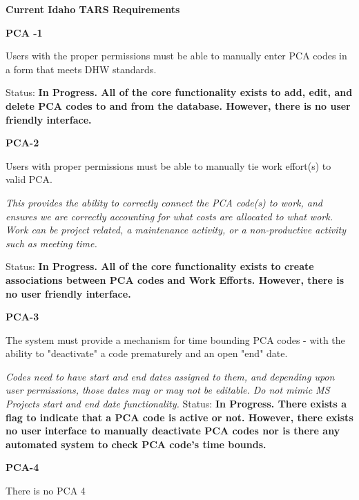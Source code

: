 \documentclass{article}
\begin{document}

\noindent \textbf{Current Idaho TARS Requirements}

\noindent \textit{}

\noindent \textbf{PCA -1}

\noindent Users with the proper permissions must be able to manually enter PCA codes in a form that meets DHW standards.

\noindent Status: \textbf{In Progress.  All of the core functionality exists to add, edit, and delete PCA codes to and from the database.  However, there is no user friendly interface.}

\noindent \textit{}


\noindent \textbf{PCA-2}

\noindent Users with proper permissions must be able to manually tie work effort(s) to valid PCA.

\noindent \textit{This provides the ability to correctly connect the PCA code(s) to work, and ensures we are correctly accounting for what costs are allocated to what work. Work can be project related, a maintenance activity, or a non-productive activity such as meeting time.}

Status: \textbf{In Progress.  All of the core functionality exists to create associations between PCA codes and Work Efforts.  However, there is no user friendly interface.}

\noindent \textit{}


\noindent \textbf{PCA-3}

\noindent The system must provide a mechanism for time bounding PCA codes - with the ability to "deactivate" a code prematurely and an open "end" date.

\noindent \textit{Codes need to have start and end dates assigned to them, and depending upon user permissions, those dates may or may not be editable. Do not mimic MS Projects start and end date functionality.}
\noindent Status: \textbf{In Progress.  There exists a flag to indicate that a PCA code is active or not.  However, there exists no user interface to manually deactivate PCA codes nor is there any automated system to check PCA code's time bounds.}

\noindent \textit{}

\noindent \textbf{PCA-4}

\noindent There is no PCA 4

\noindent \textit{}
\end{document}
